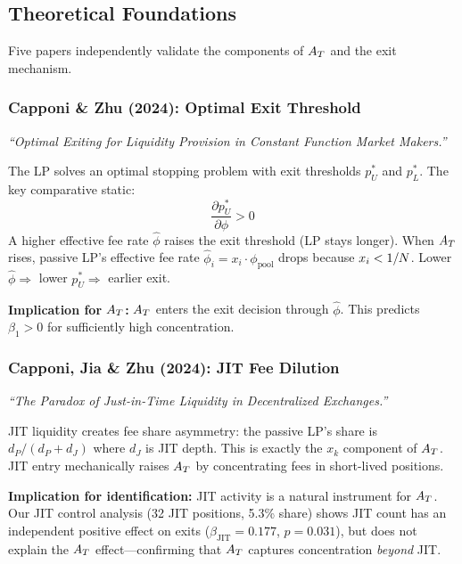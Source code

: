 \subsection{Theoretical Foundations}\label{subsec:econ-theory}

Five papers independently validate the components of $A_T$ and the exit
mechanism.

\subsubsection{Capponi \& Zhu (2024): Optimal Exit Threshold}

\emph{``Optimal Exiting for Liquidity Provision in Constant Function Market Makers.''}

The LP solves an optimal stopping problem with exit thresholds $p_U^*$ and
$p_L^*$. The key comparative static:
\begin{equation}\label{eq:capponi-exit}
  \frac{\partial p_U^*}{\partial \phi} > 0
\end{equation}
A higher effective fee rate $\hat{\phi}$ raises the exit threshold (LP stays
longer). When $A_T$ rises, passive LP's effective fee rate
$\hat{\phi}_i = x_i \cdot \phi_{\text{pool}}$ drops because $x_i < 1/N$.
Lower $\hat{\phi} \Rightarrow$ lower $p_U^* \Rightarrow$ earlier exit.

\textbf{Implication for $A_T$:} $A_T$ enters the exit decision through
$\hat{\phi}$. This predicts $\beta_1 > 0$ for sufficiently high concentration.

\subsubsection{Capponi, Jia \& Zhu (2024): JIT Fee Dilution}

\emph{``The Paradox of Just-in-Time Liquidity in Decentralized Exchanges.''}

JIT liquidity creates fee share asymmetry: the passive LP's share is
$d_P/(d_P + d_J)$ where $d_J$ is JIT depth. This is exactly the $x_k$
component of $A_T$. JIT entry mechanically raises $A_T$ by concentrating fees
in short-lived positions.

\textbf{Implication for identification:} JIT activity is a natural instrument
for $A_T$. Our JIT control analysis (32 JIT positions, 5.3\% share) shows JIT
count has an independent positive effect on exits
($\beta_{\text{JIT}} = 0.177$, $p = 0.031$), but does not explain the $A_T$
effect---confirming that $A_T$ captures concentration \emph{beyond} JIT.

